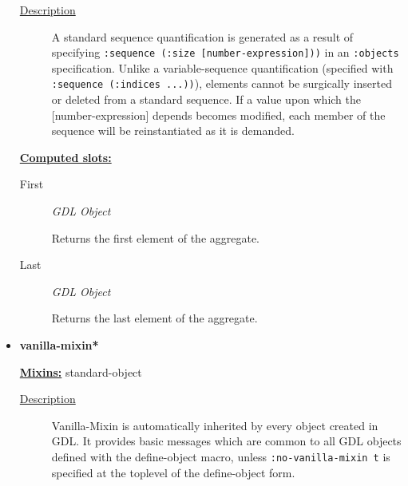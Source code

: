 \documentclass [11pt]{book}
\begin{document}
\begin{itemize}
\begin{description}

\item [
\underline{Description}]


A standard sequence quantification is generated as a result of specifying 
\texttt{:sequence (:size [number-expression]))} in an \texttt{:objects} specification. Unlike a variable-sequence 
quantification (specified with \texttt{:sequence (:indices ...))}), elements cannot be surgically inserted or 
deleted from a standard sequence. If a value upon which the [number-expression] depends becomes modified,
each member of the sequence will be reinstantiated as it is demanded.



\end{description}








\textbf{
\underline{Computed slots:}}

\begin{description}

\item [First]
\emph{GDL Object}

 Returns the first element of the aggregate.




\item [Last]
\emph{GDL Object}

 Returns the last element of the aggregate.




\end{description}







\item {}
\label{prim:vanilla-mixin*}
\textbf{vanilla-mixin*}


\textbf{
\underline{Mixins:}} standard-object





\begin{description}

\item [
\underline{Description}]


Vanilla-Mixin is automatically
inherited by every object created in GDL. It provides basic messages
which are common to all GDL objects defined with the define-object
macro, unless \texttt{:no-vanilla-mixin t} is specified at the
toplevel of the define-object form.




\end{description}
\end{itemize}
\end{document}
